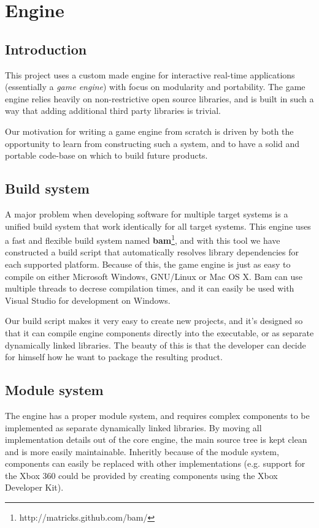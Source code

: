
\chapter{Engine}
\section {Introduction}
This project uses a custom made engine for interactive real-time applications (essentially a \textit{game engine}) with focus on modularity and portability. The game engine relies heavily on non-restrictive open source libraries, and is built in such a way that adding additional third party libraries is trivial.

Our motivation for writing a game engine from scratch is driven by both the opportunity to learn from
constructing such a system, and to have a solid and portable code-base on which to build future products.

\section {Build system}
A major problem when developing software for multiple target systems is a unified build system that work
identically for all target systems. This engine uses a fast and flexible build system named \textbf{bam}\footnote{http://matricks.github.com/bam/}, and
with this tool we have constructed a build script that automatically resolves library dependencies for each supported platform. Because of this, the game engine is just as easy to compile on either Microsoft Windows, GNU/Linux or Mac OS X. Bam can use multiple threads to decrese compilation times, and it can easily be used with Visual Studio for development on Windows.

Our build script makes it very easy to create new projects, and it's designed so that it can compile engine components directly into the executable, or as separate dynamically linked libraries. The beauty of this is that the developer can decide for himself how he want to package the resulting product.

\newpage

\section{Module system}
The engine has a proper module system, and requires complex components to be implemented as separate dynamically linked libraries. By moving all implementation details out of the core engine, the main source tree is kept clean and is more easily maintainable. Inheritly because of the module system, components can easily be replaced with other implementations (e.g. support for the Xbox 360 could be provided
by creating components using the Xbox Developer Kit).

